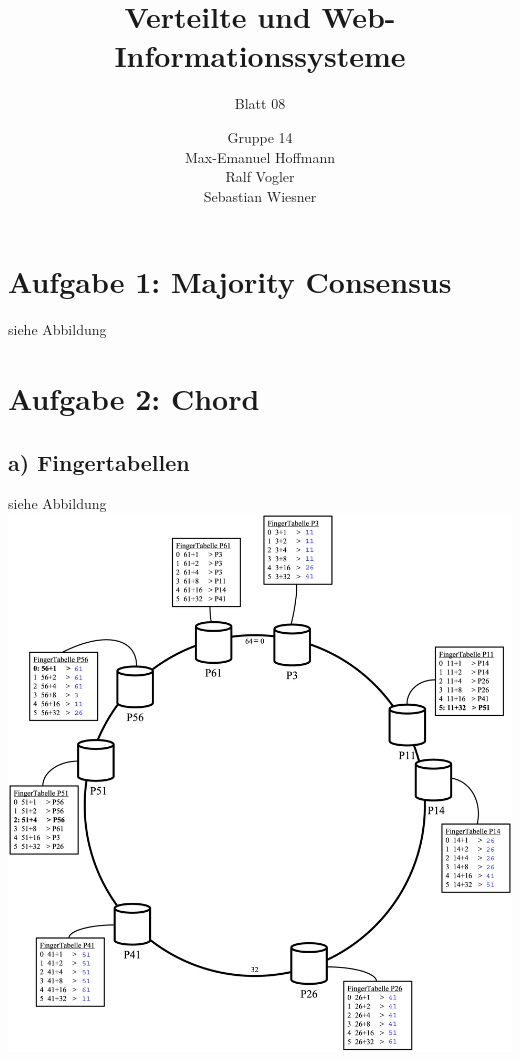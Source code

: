 \documentclass[11pt,a4paper]{scrartcl}
\begin{document}
\author{Gruppe 14\\Max-Emanuel Hoffmann\\Ralf Vogler\\Sebastian Wiesner}
\title{Verteilte und Web-Informationssysteme}
\subtitle{Blatt 08}

\maketitle

\section*{Aufgabe 1: Majority Consensus}
siehe Abbildung\\



\section*{Aufgabe 2: Chord}
\subsection*{a) Fingertabellen}
siehe Abbildung\\
\includegraphics[width=\textwidth]{Chord1.png}
\end{document}
